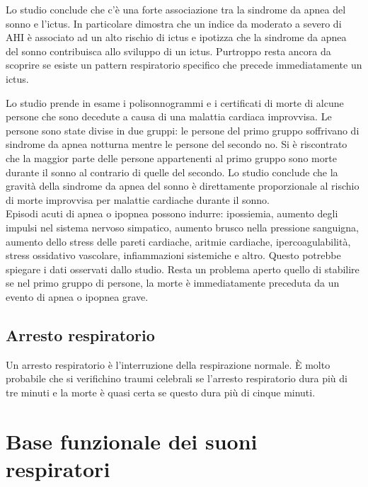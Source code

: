 Lo studio \cite{ASDBOS} conclude che c'\`e una forte associazione tra la sindrome da apnea del sonno e l'ictus. 
In particolare dimostra che un indice da moderato a severo di AHI \`e associato ad un alto rischio di ictus e ipotizza che la sindrome da apnea del sonno contribuisca allo sviluppo di un ictus. 
Purtroppo resta ancora da scoprire se esiste un pattern respiratorio specifico che precede immediatamente un ictus.

Lo studio \cite{DNPSDOSA} prende in esame i polisonnogrammi e i certificati di morte di alcune persone che sono decedute a causa di una malattia cardiaca improvvisa. 
Le persone sono state divise in due gruppi: le persone del primo gruppo soffrivano di sindrome da apnea notturna mentre le persone del secondo no. 
Si \`e riscontrato che la maggior parte delle persone appartenenti al primo gruppo sono morte durante il sonno al contrario di quelle del secondo. 
Lo studio conclude che la gravit\`a della sindrome da apnea del sonno \`e direttamente proporzionale al rischio di morte improvvisa per malattie cardiache durante il sonno. 
\\Episodi acuti di apnea o ipopnea possono indurre: ipossiemia, aumento degli impulsi nel sistema nervoso simpatico, aumento brusco nella pressione sanguigna, aumento dello stress delle pareti cardiache, aritmie cardiache, ipercoagulabilit\`a, stress ossidativo vascolare, infiammazioni sistemiche e altro. 
Questo potrebbe spiegare i dati osservati dallo studio. Resta un problema aperto quello di stabilire se nel primo gruppo di persone, la morte \`e immediatamente preceduta da un evento di apnea o ipopnea grave. 


\subsection{Arresto respiratorio}
Un arresto respiratorio \`e l'interruzione della respirazione normale. \`E molto probabile che si verifichino traumi celebrali se l'arresto respiratorio dura pi\`u di tre minuti e la morte \`e quasi certa se questo dura pi\`u di cinque minuti.

\section{Base funzionale dei suoni respiratori}


